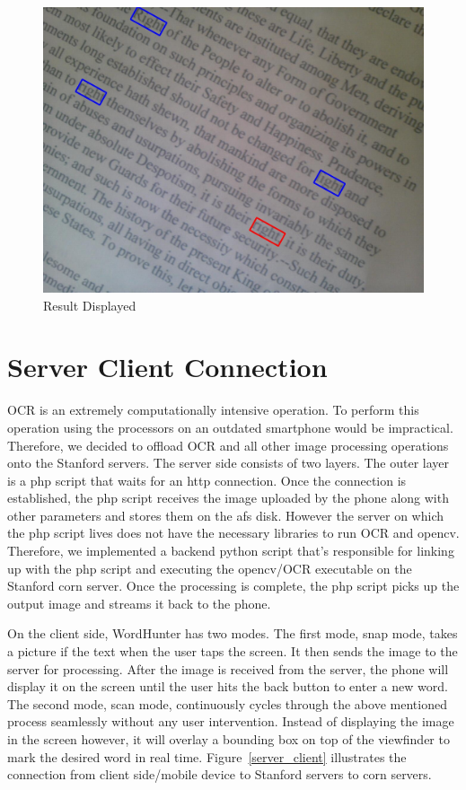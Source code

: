 \documentclass[conference]{IEEEtran}
\begin{document}
\begin{figure}
\center
\includegraphics[scale=0.15]{result_image.jpg}
\caption{Result Displayed}
\label{result_image}
\end{figure}


\section{Server Client Connection}

OCR is an extremely computationally intensive operation. To perform this operation using the processors on an outdated smartphone would be impractical. Therefore, we decided to offload OCR and all other image processing operations onto the Stanford servers. The server side consists of two layers. The outer layer is a php script that waits for an http connection. Once the connection is established, the php script receives the image uploaded by the phone along with other parameters and stores them on the afs disk. However the server on which the php script lives does not have the necessary libraries to run OCR and opencv. Therefore, we implemented a backend python script that’s responsible for linking up with the php script and executing the opencv/OCR executable on the Stanford corn server. Once the processing is complete, the php script picks up the output image and streams it back to the phone. 

On the client side, WordHunter has two modes. The first mode, snap mode, takes a picture if the text when the user taps the screen. It then sends the image to the server for processing. After the image is received from the server, the phone will display it on the screen until the user hits the back button to enter a new word.  The second mode, scan mode, continuously cycles through the above mentioned process seamlessly without any user intervention. Instead of displaying the image in the screen however, it will overlay a bounding box on top of the viewfinder to mark the desired word in real time.  Figure~\ref{server_client} illustrates the connection from client side/mobile device to Stanford servers to corn servers.
\end{document}
